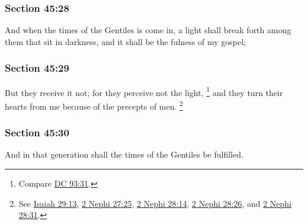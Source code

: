 	\subsubsection{Section 45:28} %
		\label{DC45-28}

		And when the times of the Gentiles is come in, a light shall break forth among them that sit in darkness, and it shall be the fulness of my gospel;


	\subsubsection{Section 45:29} %
		\label{DC45-29}

		But they receive it not; for they perceive not the light,%
			\footnote{%
				Compare \hyperref[DC93-31]{DC 93:31}.
				}
		and they turn their hearts from me because of the precepts of men.%
			\footnote{%
				See \hyperref[ISAIAH-29-13]{Isaiah 29:13}, \hyperref[2NEPHI-27-25]{2 Nephi 27:25}, \hyperref[2NEPHI-28-14]{2 Nephi 28:14}, \hyperref[2NEPHI-28-26]{2 Nephi 28:26}, and \hyperref[2NEPHI-28-31]{2 Nephi 28:31}.
				}


	\subsubsection{Section 45:30} %
		\label{DC45-30}

		And in that generation shall the times of the Gentiles be fulfilled.


